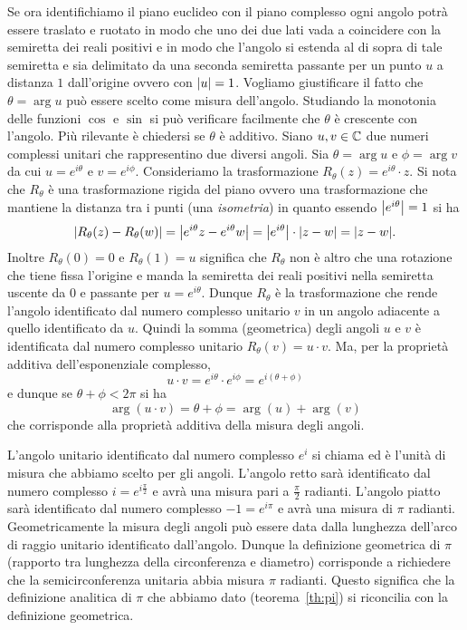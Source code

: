 Se ora identifichiamo il piano euclideo con il piano complesso ogni angolo
potrà essere traslato e ruotato in modo che uno dei due lati vada
a coincidere con la semiretta dei reali positivi e in modo che l'angolo si
estenda al di sopra di tale semiretta e sia delimitato da una seconda
semiretta passante per un punto $u$ a distanza $1$ dall'origine
ovvero con ${\left|u\right|}=1$. Vogliamo giustificare il fatto che $\theta = \arg u$
può essere scelto come misura dell'angolo.
Studiando la monotonia delle funzioni $\cos$ e $\sin$ si può verificare facilmente
che $\theta$ è crescente con l'angolo. Più rilevante è chiedersi se
$\theta$ è additivo.
Siano $u,v\in \mathbb C$ due numeri complessi unitari che rappresentino due diversi
angoli. Sia $\theta = \arg u$ e $\phi=\arg v$ da cui
$u=e^{i\theta}$ e $v=e^{i\phi}$.
Consideriamo la trasformazione $R_\theta(z) = e^{i\theta}\cdot z$.
Si nota che $R_\theta$ è una trasformazione rigida del piano ovvero
una trasformazione che mantiene la distanza tra i punti
(una \emph{isometria})
in quanto essendo ${\left|e^{i\theta}\right|}=1$ si ha
\[
{\left|R_\theta(z)-R_\theta(w)\right|} = {\left|e^{i\theta}z-e^{i\theta}w\right|}
= {\left|e^{i\theta}\right|}\cdot{\left|z-w\right|} = {\left|z-w\right|}.
\]
Inoltre $R_\theta(0)=0$ e $R_\theta(1)=u$ significa che $R_\theta$ non è altro che una
rotazione che tiene fissa l'origine e manda la semiretta dei reali
positivi nella semiretta uscente da $0$ e passante per $u=e^{i\theta}$.
Dunque $R_\theta$ è la trasformazione che rende l'angolo identificato
dal numero complesso unitario $v$ in un angolo adiacente a quello
identificato da $u$. Quindi la somma (geometrica) degli angoli
$u$ e $v$ è identificata dal numero complesso unitario
$R_\theta(v) = u\cdot v$.
Ma, per la proprietà additiva dell'esponenziale complesso,
\[
 u\cdot v = e^{i\theta} \cdot e^{i\phi} = e^{i(\theta+\phi)}
\]
e dunque se $\theta+\phi<2\pi$ si ha
\[
 \arg(u\cdot v) = \theta + \phi = \arg(u) + \arg(v)
\]
che corrisponde alla proprietà additiva della misura degli angoli.

L'angolo unitario identificato dal numero complesso $e^i$
si chiama  ed è l'unità di misura che abbiamo scelto
per gli angoli.
L'angolo retto sarà identificato dal numero complesso $i=e^{i\frac \pi 2}$
e avrà una misura pari a $\frac \pi 2$ radianti. L'angolo piatto sarà identificato
dal numero complesso $-1 = e^{i\pi}$ e avrà una misura di $\pi$ radianti.
Geometricamente la misura degli angoli può essere data dalla lunghezza
dell'arco di raggio unitario identificato dall'angolo. Dunque la definizione
geometrica di $\pi$ (rapporto tra lunghezza della circonferenza e diametro)
corrisponde a richiedere che la semicirconferenza unitaria abbia misura
$\pi$ radianti.
Questo significa che la definizione analitica di $\pi$ che abbiamo
dato (teorema~\ref{th:pi}) si riconcilia con la definizione geometrica.

